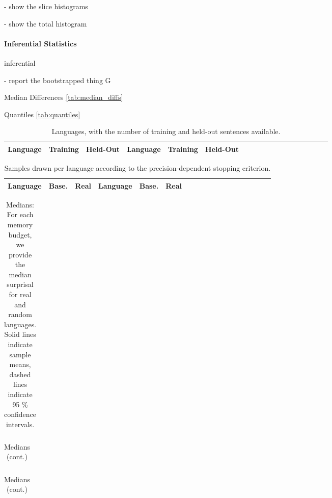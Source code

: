 \documentclass[11pt,letterpaper]{article}
\begin{document}
- show the slice histograms

- show the total histogram

\paragraph{Inferential Statistics}

inferential

- report the bootstrapped thing G

Median Differences \ref{tab:median_diffs}

Quantiles \ref{tab:quantiles}


\begin{table}
\begin{longtable}{l|ll||l|llllllllllllll}
	Language & Training & Held-Out & 	Language & Training & Held-Out\\ \hline

\end{longtable}
	\caption{Languages, with the number of training and held-out sentences available.}\label{tab:corpora}
\end{table}

\begin{table}
\begin{longtable}{l|ll||l|llllllllllllll}
	Language & Base. & Real & Language & Base. & Real \\ \hline

\end{longtable}
	\caption{Samples drawn per language according to the precision-dependent stopping criterion.}\label{tab:samples}
\end{table}

\begin{table}
\begin{longtable}{ccccccccccccccclll}

\end{longtable}
	\caption{Medians: For each memory budget, we provide the median surprisal for real and random languages. Solid lines indicate sample means, dashed lines indicate 95 \% confidence intervals.}\label{tab:medians}
\end{table}

\begin{table}
\begin{longtable}{ccccccccccccccclll}

\end{longtable}
	\caption{Medians (cont.)}
\end{table}

\begin{table}
\begin{longtable}{ccccccccccccccclll}

\end{longtable}
	\caption{Medians (cont.)}
\end{table}
\end{document}
